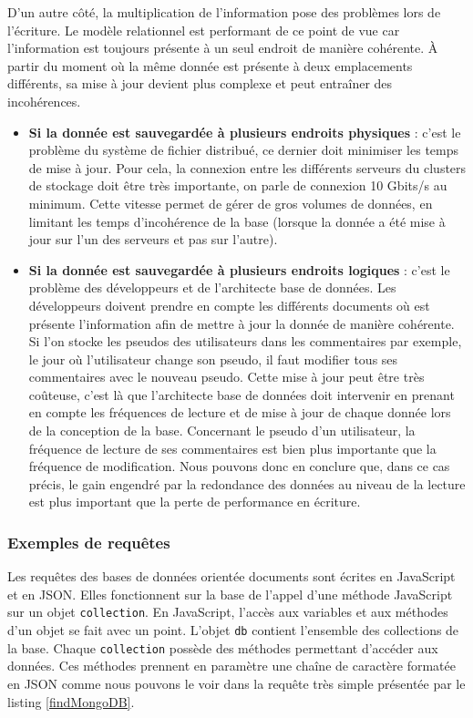 	D'un autre côté, la multiplication de l'information pose des problèmes lors de l'écriture. Le modèle relationnel est performant de ce point de vue car l'information est toujours présente à un seul endroit de manière cohérente. À partir du moment où la même donnée est présente à deux emplacements différents, sa mise à jour devient plus complexe et peut entraîner des incohérences.\\

	\begin{itemize}
		\item \textbf{Si la donnée est sauvegardée à plusieurs endroits physiques} : c'est le problème du système de fichier distribué, ce dernier doit minimiser les temps de mise à jour. Pour cela, la connexion entre les différents serveurs du clusters de stockage doit être très importante, on parle de connexion 10 Gbits/s au minimum. Cette vitesse permet de gérer de gros volumes de données, en limitant les temps d'incohérence de la base (lorsque la donnée a été mise à jour sur l'un des serveurs et pas sur l'autre).
		\item \textbf{Si la donnée est sauvegardée à plusieurs endroits logiques} : c'est le problème des développeurs et de l'architecte base de données. Les développeurs doivent prendre en compte les différents documents où est présente l'information afin de mettre à jour la donnée de manière cohérente. Si l'on stocke les pseudos des utilisateurs dans les commentaires par exemple, le jour où l'utilisateur change son pseudo, il faut modifier tous ses commentaires avec le nouveau pseudo. Cette mise à jour peut être très coûteuse, c'est là que l'architecte base de données doit intervenir en prenant en compte les fréquences de lecture et de mise à jour de chaque donnée lors de la conception de la base. Concernant le pseudo d'un utilisateur, la fréquence de lecture de ses commentaires est bien plus importante que la fréquence de modification. Nous pouvons donc en conclure que, dans ce cas précis, le gain engendré par la redondance des données au niveau de la lecture est plus important que la perte de performance en écriture. 
	\end{itemize}

\subsubsection{Exemples de requêtes}

	Les requêtes des bases de données orientée documents sont écrites en JavaScript et en JSON. Elles fonctionnent sur la base de l'appel d'une méthode JavaScript sur un objet \verb|collection|. En JavaScript, l'accès aux variables et aux méthodes d'un objet se fait avec un point. L'objet \verb|db| contient l'ensemble des collections de la base. Chaque \verb|collection| possède des méthodes permettant d'accéder aux données. Ces méthodes prennent en paramètre une chaîne de caractère formatée en JSON comme nous pouvons le voir dans la requête très simple présentée par le listing \ref{findMongoDB}.


